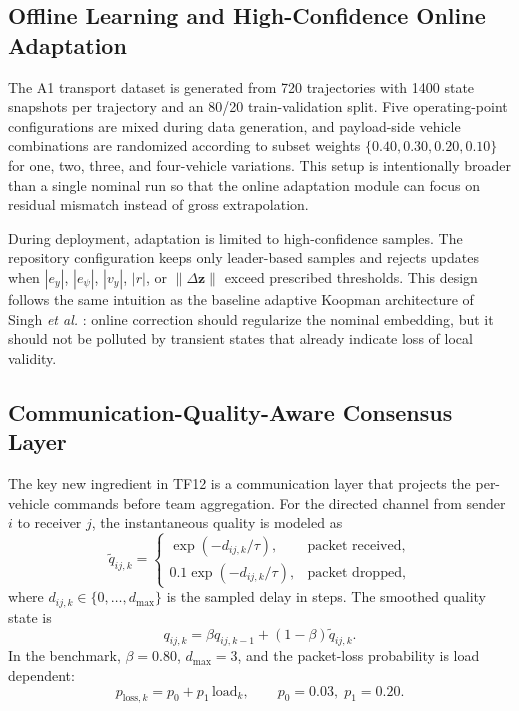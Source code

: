 \documentclass[twocolumn,3p,times,procedia]{elsarticle}
\newcommand{\tftwo}{TF12}
\begin{document}
\subsection{Offline Learning and High-Confidence Online Adaptation}
The A1 transport dataset is generated from 720 trajectories with 1400 state snapshots per trajectory and an 80/20 train-validation split. Five operating-point configurations are mixed during data generation, and payload-side vehicle combinations are randomized according to subset weights $\{0.40,0.30,0.20,0.10\}$ for one, two, three, and four-vehicle variations. This setup is intentionally broader than a single nominal run so that the online adaptation module can focus on residual mismatch instead of gross extrapolation.

During deployment, adaptation is limited to high-confidence samples. The repository configuration keeps only leader-based samples and rejects updates when $|e_y|$, $|e_{\psi}|$, $|v_y|$, $|r|$, or $\|\Delta \bm{z}\|$ exceed prescribed thresholds. This design follows the same intuition as the baseline adaptive Koopman architecture of Singh \emph{et al.} \cite{singh2024adaptive}: online correction should regularize the nominal embedding, but it should not be polluted by transient states that already indicate loss of local validity.

\subsection{Communication-Quality-Aware Consensus Layer}
The key new ingredient in \tftwo{} is a communication layer that projects the per-vehicle commands before team aggregation. For the directed channel from sender $i$ to receiver $j$, the instantaneous quality is modeled as
\begin{equation}
\tilde{q}_{ij,k}=
\begin{cases}
\exp(-d_{ij,k}/\tau), & \text{packet received},\\
0.1\exp(-d_{ij,k}/\tau), & \text{packet dropped},
\end{cases}
\end{equation}
where $d_{ij,k}\in\{0,\ldots,d_{\max}\}$ is the sampled delay in steps. The smoothed quality state is
\begin{equation}
q_{ij,k}=\beta q_{ij,k-1}+(1-\beta)\tilde{q}_{ij,k}.
\label{eq:q_update}
\end{equation}
In the benchmark, $\beta=0.80$, $d_{\max}=3$, and the packet-loss probability is load dependent:
\begin{equation}
p_{\text{loss},k}=p_0+p_1\,\mathrm{load}_k,\qquad p_0=0.03,\; p_1=0.20.
\end{equation}
\end{document}
